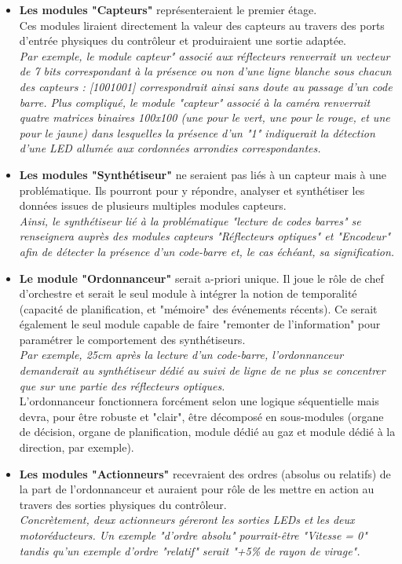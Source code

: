 		\begin{itemize}
			\item \textbf{Les modules "Capteurs"} représenteraient le premier étage.\\
			Ces modules liraient directement la valeur des capteurs au travers des ports d'entrée physiques du contrôleur et produiraient une sortie adaptée.\\
			\textit{Par exemple, le module capteur" associé aux réflecteurs renverrait un vecteur de 7 bits correspondant à la présence ou non d'une ligne blanche sous chacun des capteurs : [1001001] correspondrait ainsi sans doute au passage d'un code barre. Plus compliqué, le module "capteur" associé à la caméra renverrait quatre matrices binaires 100x100 (une pour le vert, une pour le rouge, et une pour le jaune) dans lesquelles la présence d'un "1" indiquerait la détection d'une LED allumée aux cordonnées arrondies correspondantes.}
			\item \textbf{Les modules "Synthétiseur"} ne seraient pas liés à un capteur mais à une problématique. Ils pourront pour y répondre, analyser et synthétiser les données issues de plusieurs multiples modules capteurs.\\
			\textit{Ainsi, le synthétiseur lié à la problématique "lecture de codes barres" se renseignera auprès des modules capteurs "Réflecteurs optiques" et "Encodeur" afin de détecter la présence d'un code-barre et, le cas échéant, sa signification.}
			\item \textbf{Le module "Ordonnanceur"} serait a-priori unique. Il joue le rôle de chef d'orchestre et serait le seul module à intégrer la notion de temporalité (capacité de planification, et "mémoire" des événements récents). Ce serait également le seul module capable de faire "remonter de l'information" pour paramétrer le comportement des synthétiseurs.\\
			\textit{Par exemple, 25cm après la lecture d'un code-barre, l'ordonnanceur demanderait au synthétiseur dédié au suivi de ligne de ne plus se concentrer que sur une partie des réflecteurs optiques.}\\
			L'ordonnanceur fonctionnera forcément selon une logique séquentielle mais devra, pour être robuste et "clair", être décomposé en sous-modules (organe de décision, organe de planification, module dédié au gaz et module dédié à la direction, par exemple).
			\item \textbf{Les modules "Actionneurs"} recevraient des ordres (absolus ou relatifs) de la part de l'ordonnanceur et auraient pour rôle de les mettre en action au travers des sorties physiques du contrôleur.\\
			\textit{Concrètement, deux actionneurs géreront les sorties LEDs et les deux motoréducteurs. Un exemple "d'ordre absolu" pourrait-être "Vitesse = 0" tandis qu'un exemple d'ordre "relatif" serait "+5\% de rayon de virage".}
		\end{itemize}

